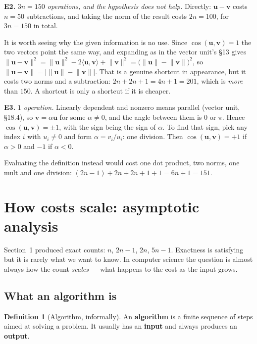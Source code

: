 \documentclass[11pt]{article}
\theoremstyle{plain}
\theoremstyle{definition}
\newtheorem{defn}{Definition}[section]
\theoremstyle{remark}
\newcommand{\vc}[1]{\mathbf{#1}}
\newcommand{\norm}[1]{\lVert #1\rVert}
\begin{document}
\smallskip
\noindent\textbf{E2.} \emph{$3n=150$ operations, and the hypothesis does not
help.} Directly: $\vc{u}-\vc{v}$ costs $n=50$ subtractions, and taking the norm
of the result costs $2n=100$, for $3n=150$ in total.

It is worth seeing why the given information is no use. Since
$\cos(\vc{u},\vc{v})=1$ the two vectors point the same way, and expanding as in
the vector unit's \S13 gives
$\norm{\vc{u}-\vc{v}}^{2}
 =\norm{\vc{u}}^{2}-2\langle\vc{u},\vc{v}\rangle+\norm{\vc{v}}^{2}
 =\bigl(\norm{\vc{u}}-\norm{\vc{v}}\bigr)^{2}$,
so $\norm{\vc{u}-\vc{v}}=\bigl\lvert\norm{\vc{u}}-\norm{\vc{v}}\bigr\rvert$.
That is a genuine shortcut in appearance, but it costs two norms and a
subtraction: $2n+2n+1=4n+1=201$, which is \emph{more} than $150$. A shortcut is
only a shortcut if it is cheaper.

\smallskip
\noindent\textbf{E3.} \emph{$1$ operation.} Linearly dependent and nonzero means
parallel (vector unit, \S18.4), so $\vc{v}=\alpha\vc{u}$ for some
$\alpha\neq0$, and the angle between them is $0$ or $\pi$. Hence
$\cos(\vc{u},\vc{v})=\pm1$, with the sign being the sign of $\alpha$. To find
that sign, pick any index $i$ with $u_i\neq0$ and form $\alpha=v_i/u_i$: one
division. Then $\cos(\vc{u},\vc{v})=+1$ if $\alpha>0$ and $-1$ if $\alpha<0$.

Evaluating the definition instead would cost one dot product, two norms, one
mult and one division: $(2n-1)+2n+2n+1+1=6n+1=151$.

\section{How costs scale: asymptotic analysis}
Section~1 produced exact counts: $n$, $2n-1$, $2n$, $5n-1$. Exactness is
satisfying but it is rarely what we want to know. In computer science the
question is almost always how the count \emph{scales} --- what happens to the
cost as the input grows.

\subsection{What an algorithm is}
\begin{defn}[Algorithm, informally]
An \textbf{algorithm} is a finite sequence of steps aimed at solving a problem.
It usually has an \textbf{input} and always produces an \textbf{output}.
\end{defn}
\end{document}
